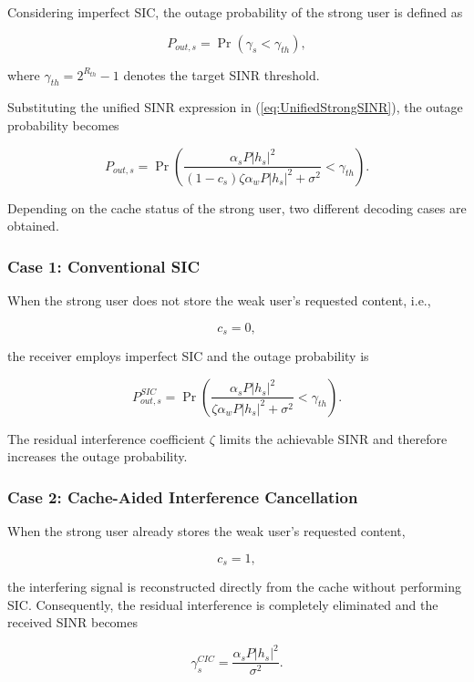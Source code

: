 \documentclass[conference]{IEEEtran}
\begin{document}
Considering imperfect SIC, the outage probability of the strong user is defined as

\begin{equation}
P_{out,s}
=
\Pr
\left(
\gamma_s
<
\gamma_{th}
\right),
\end{equation}

where $\gamma_{th}=2^{R_{th}}-1$ denotes the target SINR threshold.

Substituting the unified SINR expression in (\ref{eq:UnifiedStrongSINR}), the outage probability becomes

\begin{equation}
P_{out,s}
=
\Pr
\left(
\frac{\alpha_sP|h_s|^2}
{(1-c_s)\zeta\alpha_wP|h_s|^2+\sigma^2}
<
\gamma_{th}
\right).
\end{equation}

Depending on the cache status of the strong user, two different decoding cases are obtained.

\subsubsection*{Case 1: Conventional SIC}

When the strong user does not store the weak user's requested content, i.e.,

\[
c_s=0,
\]

the receiver employs imperfect SIC and the outage probability is

\begin{equation}
P_{out,s}^{SIC}
=
\Pr
\left(
\frac{\alpha_sP|h_s|^2}
{\zeta\alpha_wP|h_s|^2+\sigma^2}
<
\gamma_{th}
\right).
\end{equation}

The residual interference coefficient $\zeta$ limits the achievable SINR and therefore increases the outage probability.

\subsubsection*{Case 2: Cache-Aided Interference Cancellation}

When the strong user already stores the weak user's requested content,

\[
c_s=1,
\]

the interfering signal is reconstructed directly from the cache without performing SIC. Consequently, the residual interference is completely eliminated and the received SINR becomes

\begin{equation}
\gamma_s^{CIC}
=
\frac{\alpha_sP|h_s|^2}
{\sigma^2}.
\end{equation}
\end{document}
